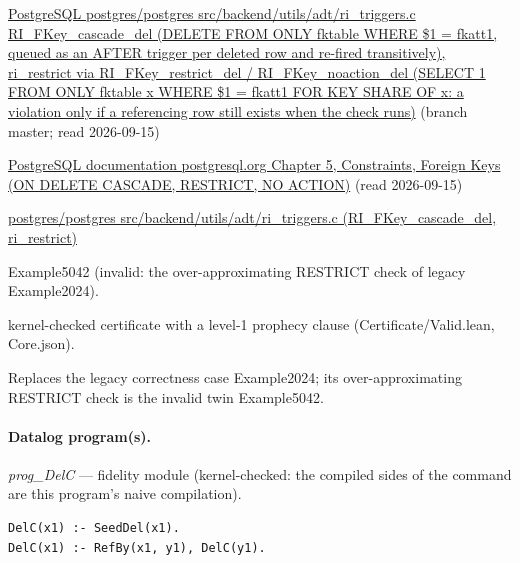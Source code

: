 \documentclass[10pt]{article}
\begin{document}
\begin{description}[leftmargin=2.6cm,style=nextline,itemsep=1pt]
\item[Sources] {\raggedright \href{https://github.com/postgres/postgres/blob/master/src/backend/utils/adt/ri_triggers.c}{PostgreSQL postgres/postgres src/backend/utils/adt/ri\_triggers.c RI\_FKey\_cascade\_del (DELETE FROM ONLY fktable WHERE \$1 = fkatt1, queued as an AFTER trigger per deleted row and re-fired transitively), ri\_restrict via RI\_FKey\_restrict\_del / RI\_FKey\_noaction\_del (SELECT 1 FROM ONLY fktable x WHERE \$1 = fkatt1 FOR KEY SHARE OF x: a violation only if a referencing row still exists when the check runs)} (branch master; read 2026-09-15) \par \href{https://www.postgresql.org/docs/current/ddl-constraints.html}{PostgreSQL documentation postgresql.org Chapter 5, Constraints, Foreign Keys (ON DELETE CASCADE, RESTRICT, NO ACTION)} (read 2026-09-15) \par \href{https://github.com/postgres/postgres/blob/master/src/backend/utils/adt/ri_triggers.c}{postgres/postgres src/backend/utils/adt/ri\_triggers.c (RI\_FKey\_cascade\_del, ri\_restrict)}\par}

\item[Twin] Example5042 (invalid: the over-approximating RESTRICT check of legacy Example2024).

\item[Prophecy] kernel-checked certificate with a level-1 prophecy clause (Certificate/Valid.lean, Core.json).

\item[Note] Replaces the legacy correctness case Example2024; its over-approximating RESTRICT check is the invalid twin Example5042.

\end{description}

\paragraph{Datalog program(s).}

{\raggedright\textit{prog\_DelC} --- fidelity module (kernel-checked: the compiled sides of the command are this program's naive compilation).\par}

\begin{Verbatim}[fontsize=\scriptsize,breaklines=true,breakanywhere=true,frame=single,framesep=1.5mm]
DelC(x1) :- SeedDel(x1).
DelC(x1) :- RefBy(x1, y1), DelC(y1).
\end{Verbatim}
\end{document}
